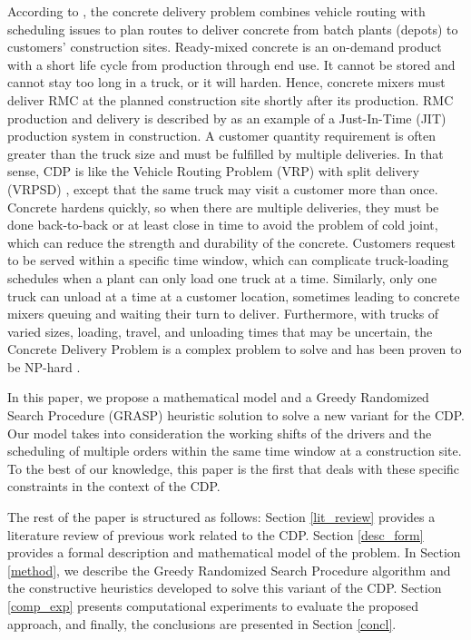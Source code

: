 \documentclass{article}
\begin{document}
According to \cite{blazewicz2019handbook}, the concrete delivery problem combines vehicle routing with scheduling issues to plan routes to deliver concrete from batch plants (depots) to customers' construction sites. Ready-mixed concrete is an on-demand product with a short life cycle from production through end use. It cannot be stored and cannot stay too long in a truck, or it will harden. Hence, concrete mixers must deliver RMC at the planned construction site shortly after its production. RMC production and delivery is described by \cite{tommelein1999just} as an example of a Just-In-Time (JIT) production system in construction. A customer quantity requirement is often greater than the truck size and must be fulfilled by multiple deliveries. In that sense, CDP is like the Vehicle Routing Problem (VRP) with split delivery (VRPSD) \citep{archetti2008split}, except that the same truck may visit a customer more than once. Concrete hardens quickly, so when there are multiple deliveries, they must be done back-to-back or at least close in time to avoid the problem of cold joint, which can reduce the strength and durability of the concrete. Customers request to be served within a specific time window, which can complicate truck-loading schedules when a plant can only load one truck at a time. Similarly, only one truck can unload at a time at a customer location, sometimes leading to concrete mixers queuing and waiting their turn to deliver. Furthermore, with trucks of varied sizes, loading, travel, and unloading times that may be uncertain, the Concrete Delivery Problem is a complex problem to solve and has been proven to be NP-hard \citep{asbach2009analysis,kinable2014concrete}. 

In this paper, we propose a mathematical model and a Greedy Randomized Search Procedure (GRASP) heuristic solution to solve a new variant for the CDP. Our model takes into consideration the working shifts of the drivers and the scheduling of multiple orders within the same time window at a construction site. To the best of our knowledge, this paper is the first that deals with these specific constraints in the context of the CDP.

The rest of the paper is structured as follows: Section \ref{lit_review} provides a literature review of previous work related to the CDP. Section \ref{desc_form} provides a formal description and mathematical model of the problem. In Section \ref{method}, we describe the Greedy Randomized Search Procedure algorithm and the constructive heuristics developed to solve this variant of the CDP. Section \ref{comp_exp}  presents computational experiments to evaluate the proposed approach, and finally, the conclusions are presented in Section \ref{concl}.
\end{document}
